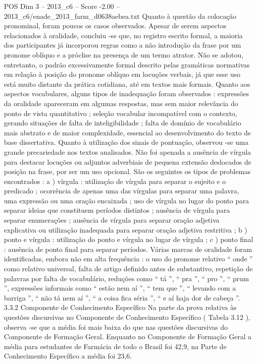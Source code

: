 \begin{textsample}{POS Dim 3 – 2013\_c6 – Score -2.00 – 2013\_c6/enade\_2013\_farm\_d0638aebea.txt}
Quanto à questão da colocação pronominal, foram poucos os casos observados.
Apesar de serem aspectos relacionados à oralidade, concluiu -se que, no registro escrito formal, a maioria dos participantes já incorporou regras como a não introdução da frase por um pronome oblíquo e a próclise na presença de um termo atrator.
Não se adotou, entretanto, o padrão excessivamente formal descrito pelas gramáticas normativas em relação à posição do pronome oblíquo em locuções verbais, já que esse uso está muito distante da prática cotidiana, até em textos mais formais.
Quanto aos aspectos vocabulares, alguns tipos de inadequação foram observados : expressões da oralidade apareceram em algumas respostas, mas sem maior relevância do ponto de vista quantitativo ; seleção vocabular incompatível com o contexto, gerando situações de falta de inteligibilidade ; falta de domínio de vocabulário mais abstrato e de maior complexidade, essencial ao desenvolvimento do texto de base dissertativa.
Quanto à utilização dos sinais de pontuação, observou -se uma grande precariedade nos textos analisados.
Não foi apenada a ausência de vírgula para destacar locuções ou adjuntos adverbiais de pequena extensão deslocados de posição na frase, por ser um uso opcional.
São os seguintes os tipos de problemas encontrados : a ) vírgula : utilização de vírgula para separar o sujeito e o predicado ; ocorrência de apenas uma das vírgulas para separar uma palavra, uma expressão ou uma oração encaixada ; uso de vírgula no lugar do ponto para separar ideias que constituem períodos distintos ; ausência de vírgula para separar enumerações ; ausência de vírgula para separar oração adjetiva explicativa ou utilização inadequada para separar oração adjetiva restritiva ; b ) ponto e vírgula : utilização do ponto e vírgula no lugar de vírgula ; c ) ponto final : ausência de ponto final para separar períodos.
Várias marcas de oralidade foram identificadas, embora não em alta frequência : o uso do pronome relativo “ onde ” como relativo universal, falta de artigo definido antes de substantivo, repetição de palavras por falta de vocabulário, reduções como “ tá ”, “ pra ”, “ pro ”, “ prum ”, expressões informais como “ estão nem aí ”, “ tem que ”, “ levando com a barriga ”, “ não tá nem aí ”, “ a coisa fica séria ”, “ e aí haja dor de cabeça ”. 3.3.2 Componente de Conhecimento Específico Na parte da prova relativa às questões discursivas no Componente de Conhecimento Específico ( Tabela 3.12 ), observa -se que a média foi mais baixa do que nas questões discursivas do Componente de Formação Geral.
Enquanto no Componente de Formação Geral a média para estudantes de Farmácia de todo o Brasil foi 42,9, na Parte de Conhecimento Específico a média foi 23,6.

\end{textsample}
